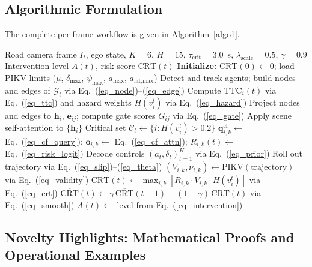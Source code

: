 \documentclass[preprint,12pt]{elsarticle}
\begin{document}
\subsection{Algorithmic Formulation}
The complete per-frame workflow is given in Algorithm~\ref{algo1}.

\begin{algorithm}[H]
	\caption{PC-CSG Counterfactual Anomaly Anticipation Pipeline}
	\begin{algorithmic}[1]
		\Require Road camera frame $I_t$, ego state, $K=6$, $H=15$, $\tau_{\text{crit}}=3.0$~s, $\lambda_{\text{scale}}=0.5$, $\gamma = 0.9$
		\Ensure Intervention level $A(t)$, risk score $\overline{\text{CRT}}(t)$
		\State \textbf{Initialize:} $\overline{\text{CRT}}(0) \gets 0$; load PIKV limits ($\mu$, $\delta_{\max}$, $\dot{\psi}_{\max}$, $a_{\max}$, $a_{\text{lat,max}}$)
			\State Detect and track agents; build nodes and edges of $\mathcal{G}_t$ via Eq.~(\ref{eq_node})--(\ref{eq_edge})
			\State Compute $\text{TTC}_i(t)$ via Eq.~(\ref{eq_ttc}) and hazard weights $H(v_i^t)$ via Eq.~(\ref{eq_hazard})
			\State Project nodes and edges to $\mathbf{h}_i$, $\mathbf{e}_{ij}$; compute gate scores $G_{ij}$ via Eq.~(\ref{eq_gate})
			\State Apply scene self-attention to $\{\mathbf{h}_i\}$
			\State Critical set $\mathcal{C}_t \gets \{i : H(v_i^t) > 0.2\}$
			 
				\State $\mathbf{q}_{i,k}^{\text{cf}} \gets$ Eq.~(\ref{eq_cf_query}); \; $\mathbf{o}_{i,k} \gets$ Eq.~(\ref{eq_cf_attn}); \; $R_{i,k}(t) \gets$ Eq.~(\ref{eq_risk_logit})
				\State Decode controls $(a_t, \delta_t)_{t=1}^{H}$ via Eq.~(\ref{eq_prior})
				\State Roll out trajectory via Eq.~(\ref{eq_slip})--(\ref{eq_theta})
				\State $(V_{i,k}, \nu_{i,k}) \gets \text{PIKV}(\text{trajectory})$ via Eq.~(\ref{eq_validity})
			\EndFor
			\State $\text{CRT}(t) \gets \max_{i,k} [R_{i,k} \cdot V_{i,k} \cdot H(v_i^t)]$ via Eq.~(\ref{eq_crt})
			\State $\overline{\text{CRT}}(t) \gets \gamma \, \overline{\text{CRT}}(t-1) + (1-\gamma) \, \text{CRT}(t)$ via Eq.~(\ref{eq_smooth})
			\State $A(t) \gets$ level from Eq.~(\ref{eq_intervention})
		\EndFor
	\end{algorithmic}
	\label{algo1}
\end{algorithm}

\subsection{Novelty Highlights: Mathematical Proofs and Operational Examples}
\end{document}

